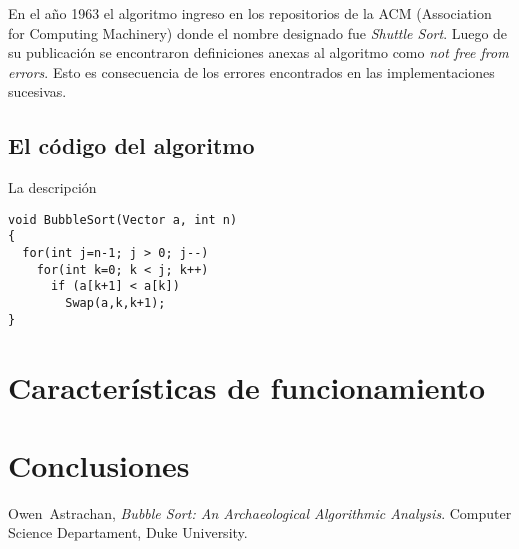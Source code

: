 \documentclass[conference]{IEEEtran}
\begin{document}
En el año 1963 el algoritmo ingreso en los repositorios de la ACM
(Association for Computing Machinery) donde el nombre designado fue
\emph{Shuttle Sort}. Luego de su publicación se encontraron
definiciones anexas al algoritmo como \emph{not free from
  errors}. Esto es consecuencia de los errores encontrados en las
implementaciones sucesivas. 

\subsection{El código del algoritmo}
\label{sec:origen-code}

La descripción 
\begin{verbatim}
void BubbleSort(Vector a, int n)
{
  for(int j=n-1; j > 0; j--)
    for(int k=0; k < j; k++)
      if (a[k+1] < a[k])
        Swap(a,k,k+1);
}
\end{verbatim}

\section{Características de funcionamiento}
\label{sec:car-func}

\section{Conclusiones}
\label{sec:conc}


\begin{thebibliography}{1}
  Owen~Astrachan, \emph{Bubble Sort: An Archaeological Algorithmic
    Analysis}. Computer Science Departament, Duke University. 
\end{thebibliography}

\end{document}
